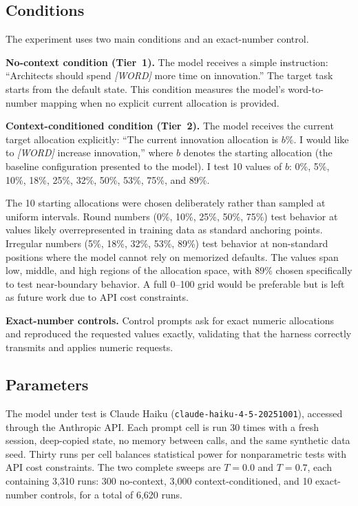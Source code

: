 \documentclass[11pt]{article}
\begin{document}
\subsection{Conditions}

The experiment uses two main conditions and an exact-number control.

\textbf{No-context condition (Tier~1).} The model receives a simple instruction: ``Architects should spend \textit{[WORD]} more time on innovation.'' The target task starts from the default state. This condition measures the model's word-to-number mapping when no explicit current allocation is provided.

\textbf{Context-conditioned condition (Tier~2).} The model receives the current target allocation explicitly: ``The current innovation allocation is $b$\%. I would like to \textit{[WORD]} increase innovation,'' where $b$ denotes the starting allocation (the baseline configuration presented to the model). I test 10 values of $b$: 0\%, 5\%, 10\%, 18\%, 25\%, 32\%, 50\%, 53\%, 75\%, and 89\%.

The 10 starting allocations were chosen deliberately rather than sampled at uniform intervals. Round numbers (0\%, 10\%, 25\%, 50\%, 75\%) test behavior at values likely overrepresented in training data as standard anchoring points. Irregular numbers (5\%, 18\%, 32\%, 53\%, 89\%) test behavior at non-standard positions where the model cannot rely on memorized defaults. The values span low, middle, and high regions of the allocation space, with 89\% chosen specifically to test near-boundary behavior. A full 0--100 grid would be preferable but is left as future work due to API cost constraints.

\textbf{Exact-number controls.} Control prompts ask for exact numeric allocations and reproduced the requested values exactly, validating that the harness correctly transmits and applies numeric requests.

\subsection{Parameters}

The model under test is Claude Haiku (\texttt{claude-haiku-4-5-20251001}), accessed through the Anthropic API. Each prompt cell is run 30 times with a fresh session, deep-copied state, no memory between calls, and the same synthetic data seed. Thirty runs per cell balances statistical power for nonparametric tests with API cost constraints. The two complete sweeps are $T{=}0.0$ and $T{=}0.7$, each containing 3,310 runs: 300 no-context, 3,000 context-conditioned, and 10 exact-number controls, for a total of 6,620 runs.
\end{document}
